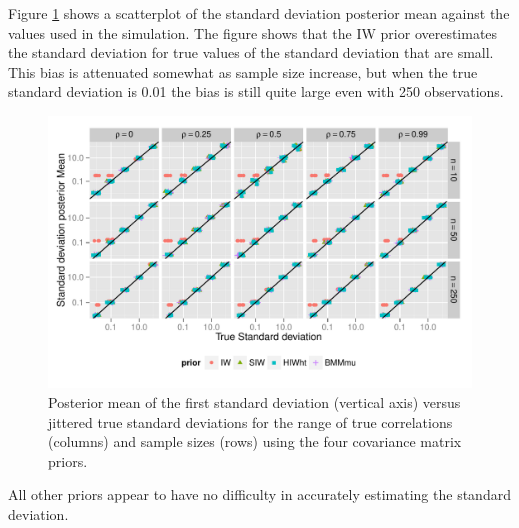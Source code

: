 \documentclass[12pt]{article}
\begin{document}

Figure \ref{devF1} shows a scatterplot of the standard deviation posterior mean against the values used in the simulation. The figure shows that the IW prior overestimates the standard deviation for true values of the standard deviation that are small.  This bias is attenuated somewhat as sample size increase, but when the true standard deviation is 0.01 the bias is still quite large even with 250 observations. 

\begin{figure}[htbp]
\centering
\includegraphics[width=\textwidth]{fig_s1_d2} 
\vspace{-.5in}
\caption{Posterior mean of the first standard deviation (vertical axis) versus jittered true standard deviations for the range of true correlations (columns) and sample sizes (rows) using the four covariance matrix priors.}
\label{devF1} 
\end{figure}

All other priors appear to have no difficulty in accurately estimating the standard deviation.  
\end{document}
